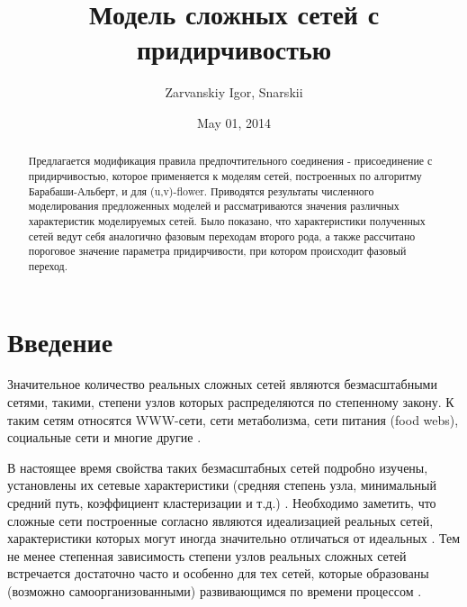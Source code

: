 \documentclass[10pt,aps,pra]{revtex4-1}
\begin{document}
\title{Модель сложных сетей с придирчивостью}
\author{Zarvanskiy Igor, Snarskii}


\date{May 01, 2014}

\begin{abstract}
    Предлагается модификация правила предпочтительного соединения - присоединение с придирчивостью, которое применяется к моделям сетей, построенных по алгоритму Барабаши-Альберт, и для  (u,v)-flower. Приводятся результаты численного моделирования предложенных моделей и рассматриваются значения различных характеристик моделируемых сетей. Было показано, что характеристики полученных сетей ведут себя аналогично фазовым переходам второго рода, а также рассчитано пороговое значение параметра придирчивости, при котором происходит фазовый переход.
\end{abstract}

\maketitle

\linenumbers\par

\section{Введение}

    Значительное количество реальных сложных сетей являются безмасштабными сетями, такими, степени узлов которых распределяются по степенному закону. К таким сетям относятся WWW-сети, сети метаболизма, сети питания (food webs), социальные сети и многие другие \cite{Dor2}.

    В настоящее время свойства таких безмасштабных сетей подробно изучены, установлены их сетевые характеристики (средняя степень узла, минимальный средний путь, коэффициент кластеризации и т.д.) \cite{Newman1}. Необходимо заметить, что сложные сети построенные согласно \cite{AlBa2} являются идеализацией реальных сетей, характеристики которых могут иногда значительно отличаться от идеальных \cite{Newman1}. Тем не менее степенная зависимость степени узлов реальных сложных сетей встречается достаточно часто и особенно для тех сетей, которые образованы (возможно самоорганизованными) развивающимся по времени процессом \cite{Newman3, AlBa3}.
\end{document}
